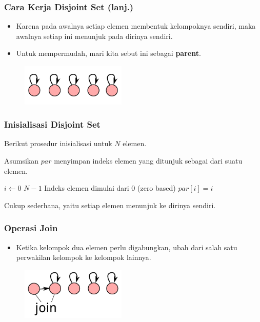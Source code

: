 \begin{frame}
\frametitle{Cara Kerja Disjoint Set (lanj.)}
\begin{itemize}
  \item Karena pada awalnya setiap elemen membentuk kelompoknya sendiri, maka awalnya setiap  ini menunjuk pada dirinya sendiri.
  \item Untuk mempermudah, mari kita sebut  ini sebagai \textbf{parent}.
\end{itemize}
\begin{figure}
  \includegraphics[width=5cm]{asset/djs-init.pdf}
\end{figure}
\end{frame}

\begin{frame}
\frametitle{Inisialisasi Disjoint Set}
Berikut prosedur inisialisasi \pdjs untuk $N$ elemen. \newline

Asumsikan \farray $par$ menyimpan indeks elemen yang ditunjuk sebagai  dari suatu elemen.
\begin{codebox}
\li \For $i \gets 0$ \To $N-1$ \Comment Indeks elemen dimulai dari 0 (zero based)
\li \Do   $par[i] = i$ 
    \End
\end{codebox}

Cukup sederhana, yaitu setiap elemen menunjuk ke dirinya sendiri.
\end{frame}

\begin{frame}
\frametitle{Operasi Join}
\begin{itemize}
  \item Ketika kelompok dua elemen perlu digabungkan, ubah  dari salah satu perwakilan kelompok ke kelompok lainnya.
\end{itemize}
\begin{figure}
  \includegraphics[width=5cm]{asset/djs-join-1.pdf}
\end{figure}
\end{frame}

